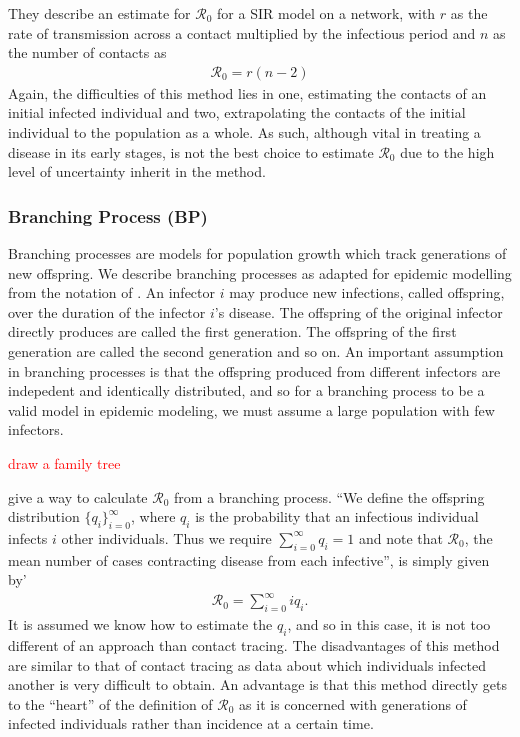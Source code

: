 \documentclass[12pt]{article}
\newcommand{\com}[1]{\textcolor{red}{ #1}}
\newcommand{\rr}{\ensuremath{\mathcal{R}_0}}
\begin{document}
They describe an estimate for $\rr$ for a SIR model on a network, with $r$ as the rate of transmission across a contact multiplied by the infectious period and $n$ as the number of contacts as
\begin{align*}
\rr = r(n-2)
\end{align*}
Again, the difficulties of this method lies in one, estimating the contacts of an initial infected individual and two, extrapolating the contacts of the initial individual to the population as a whole.  As such, although vital in treating a disease in its early stages, is not the best choice to estimate $\rr$ due to the high level of uncertainty inherit in the method.



\subsubsection{Branching Process (BP)}
\label{sec:branching-process}

Branching processes are models for population growth which track generations of new offspring.  We describe branching processes as adapted for epidemic modelling from the notation of \cite{grimmett1992}.  An infector $i$ may produce new infections, called offspring, over the duration of the  infector $i$'s disease.  The offspring of the original infector directly produces are called the first generation.  The offspring of the first generation are called the second generation and so on.  An important assumption in branching processes is that the offspring produced from different infectors are indepedent and identically distributed, and so for a branching process to be a valid model in epidemic modeling, we must assume a large population with few infectors.

\com{draw a family tree}

\cite{getz2006} give a way to calculate $\rr$ from a branching process.  ``We define the offspring distribution $\{q_i \}_{i=0}^\infty$, where $q_i$  is the probability that an infectious individual infects $i$ other individuals.  Thus we require $\sum_{i=0}^\infty q_i =1$ and note that $\rr$, the mean number of cases contracting disease from each infective'', is simply given by'
  \begin{align*}
    \rr = \sum_{i=0}^\infty iq_i.
  \end{align*}
  It is assumed we know how to estimate the $q_i$, and so in this case, it is not too different of an approach than contact tracing.  The disadvantages of this method are similar to that of contact tracing as data about which individuals  infected another is very difficult to obtain.  An advantage is that this method directly gets to the ``heart'' of the definition of $\rr$ as it is concerned with generations of infected individuals rather than incidence at a certain time.
\end{document}
